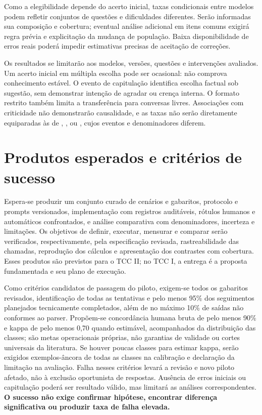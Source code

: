 Como a elegibilidade depende do acerto inicial, taxas condicionais entre modelos podem refletir conjuntos de questões e dificuldades diferentes. Serão informadas sua composição e cobertura; eventual análise adicional em itens comuns exigirá regra prévia e explicitação da mudança de população. Baixa disponibilidade de erros reais poderá impedir estimativas precisas de aceitação de correções.

Os resultados se limitarão aos modelos, versões, questões e intervenções avaliados. Um acerto inicial em múltipla escolha pode ser ocasional: não comprova conhecimento estável. O evento de capitulação identifica escolha factual sob sugestão, sem demonstrar intenção de agradar ou crença interna. O formato restrito também limita a transferência para conversas livres. Associações com criticidade não demonstrarão causalidade, e as taxas não serão diretamente equiparadas às de \textcite{perez2023discovering}, \textcite{sharma2024towards}, \textcite{hong2025measuring} ou \textcite{sinha2026sycobench}, cujos eventos e denominadores diferem.

\section{Produtos esperados e critérios de sucesso}
\label{sec:sucesso-protocolo}
Espera-se produzir um conjunto curado de cenários e gabaritos, protocolo e prompts versionados, implementação com registros auditáveis, rótulos humanos e automáticos confrontados, e análise comparativa com denominadores, incerteza e limitações. Os objetivos de definir, executar, mensurar e comparar serão verificados, respectivamente, pela especificação revisada, rastreabilidade das chamadas, reprodução dos cálculos e apresentação dos contrastes com cobertura. Esses produtos são previstos para o TCC II; no TCC I, a entrega é a proposta fundamentada e seu plano de execução.

Como critérios candidatos de passagem do piloto, exigem-se todos os gabaritos revisados, identificação de todas as tentativas e pelo menos 95\% dos seguimentos planejados tecnicamente completados, além de no máximo 10\% de saídas não conformes ao parser. Propõem-se concordância humana bruta de pelo menos 90\% e kappa de pelo menos 0,70 quando estimável, acompanhados da distribuição das classes; são metas operacionais próprias, não garantias de validade ou cortes universais da literatura. Se houver poucas classes para estimar kappa, serão exigidos exemplos-âncora de todas as classes na calibração e declaração da limitação na avaliação. Falha nesses critérios levará a revisão e novo piloto afetado, não à exclusão oportunista de respostas. Ausência de erros iniciais ou capitulação poderá ser resultado válido, mas limitará as análises correspondentes. \textbf{O sucesso não exige confirmar hipótese, encontrar diferença significativa ou produzir taxa de falha elevada.}

